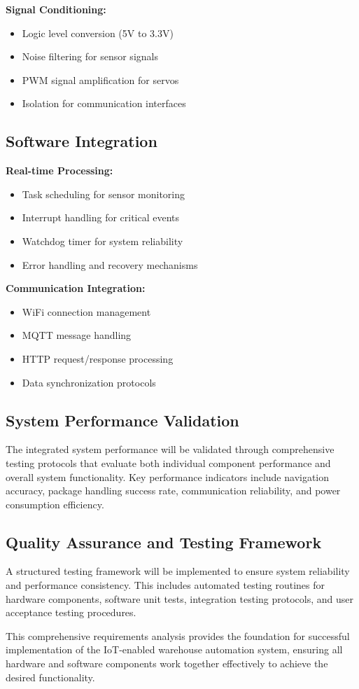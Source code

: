 \textbf{Signal Conditioning:}
\begin{itemize}
\item Logic level conversion (5V to 3.3V)
\item Noise filtering for sensor signals
\item PWM signal amplification for servos
\item Isolation for communication interfaces
\end{itemize}

\subsection{Software Integration}
\textbf{Real-time Processing:}
\begin{itemize}
\item Task scheduling for sensor monitoring
\item Interrupt handling for critical events
\item Watchdog timer for system reliability
\item Error handling and recovery mechanisms
\end{itemize}

\textbf{Communication Integration:}
\begin{itemize}
\item WiFi connection management
\item MQTT message handling
\item HTTP request/response processing
\item Data synchronization protocols
\end{itemize}

\subsection{System Performance Validation}
The integrated system performance will be validated through comprehensive testing protocols that evaluate both individual component performance and overall system functionality. Key performance indicators include navigation accuracy, package handling success rate, communication reliability, and power consumption efficiency.

\subsection{Quality Assurance and Testing Framework}
A structured testing framework will be implemented to ensure system reliability and performance consistency. This includes automated testing routines for hardware components, software unit tests, integration testing protocols, and user acceptance testing procedures.

This comprehensive requirements analysis provides the foundation for successful implementation of the IoT-enabled warehouse automation system, ensuring all hardware and software components work together effectively to achieve the desired functionality.